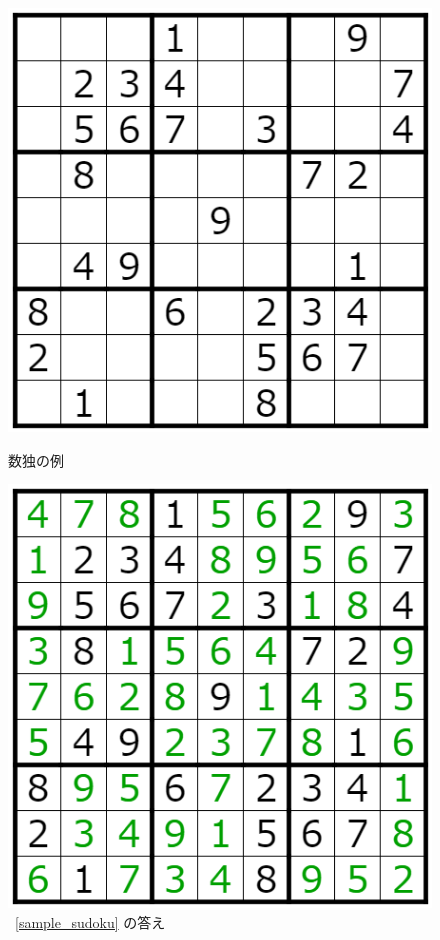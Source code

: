 \documentclass[submit,techrep,noauthor]{ipsj}
\begin{document}
	\begin{figure}[tb]
	\begin{minipage}[t]{0.5\columnwidth}
 	\includegraphics[keepaspectratio, scale=0.25]
      		{sample_sudoku.png}
 	\caption{数独の例}
 	\label{sample_sudoku}
	\end{minipage}%
	\begin{minipage}[t]{0.5\columnwidth}
 	\includegraphics[keepaspectratio, scale=0.25]
      		{sample_sudoku_answer.png}
 	\caption{\figurename~\ref{sample_sudoku} の答え}
 	\label{sample_sudoku_answer}
	\end{minipage}
  	\end{figure}
\end{document}
